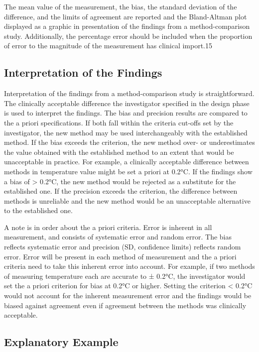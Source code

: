\documentclass[]{article}
\begin{document}
The mean value of the measurement, the bias, the standard deviation of the difference, and the limits of agreement are reported and the Bland-Altman plot displayed as a graphic in presentation of the findings from a method-comparison study. Additionally, the percentage error should be included when the proportion of error to the magnitude of the measurement has clinical import.15

\subsection*{Interpretation of the Findings}

Interpretation of the findings from a method-comparison study is straightforward. The clinically acceptable difference the investigator specified in the design phase is used to interpret the findings. The bias and precision results are compared to the a priori specifications. If both fall within the criteria cut-offs set by the investigator, the new method may be used interchangeably with the established method. If the bias exceeds the criterion, the new method over- or underestimates the value obtained with the established method to an extent that would be unacceptable in practice. For example, a clinically acceptable difference between methods in temperature value might be set a priori at 0.2°C. If the findings show a bias of > 0.2°C, the new method would be rejected as a substitute for the established one. If the precision exceeds the criterion, the difference between methods is unreliable and the new method would be an unacceptable alternative to the established one.

A note is in order about the a priori criteria. Error is inherent in all measurement, and consists of systematic error and random error. The bias reflects systematic error and precision (SD, confidence limits) reflects random error. Error will be present in each method of measurement and the a priori criteria need to take this inherent error into account. For example, if two methods of measuring temperature each are accurate to ± 0.2°C, the investigator would set the a priori criterion for bias at 0.2°C or higher. Setting the criterion < 0.2°C would not account for the inherent measurement error and the findings would be biased against agreement even if agreement between the methods was clinically acceptable.
\newpage
\subsection{Explanatory Example}
\end{document}
